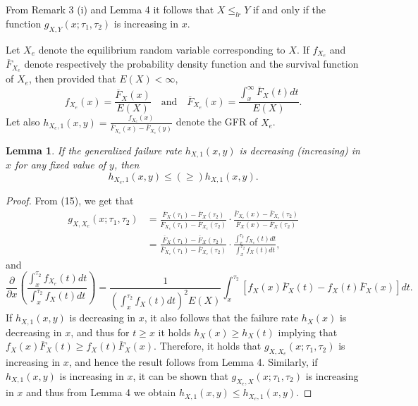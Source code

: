 \documentclass[11pt]{article}
\newtheorem{lemma}{Lemma}
\begin{document}
From Remark 3 (i) and Lemma 4 it follows that $X \leq_{lr} Y$ if and only if the function $g_{X,Y} (x;\tau_1,\tau_2)$ is increasing in $x$.

Let $X_e$ denote the equilibrium random variable corresponding to $X$. If $f_{X_e}$ and $\overline{F}_{X_e}$ denote respectively the probability density function and the survival function of $X_e$, then provided that $E(X)<\infty$,
$$ \textstyle f_{X_e} (x) = \frac{\overline{F}_X (x)}{E(X)} \quad \text{and} \quad \overline{F}_{X_e} (x) = \frac{\int_x^\infty \overline{F}_X (t) dt}{E(X)}. $$
Let also $ \textstyle h_{X_e,1} (x,y) = \frac{f_{X_e} (x)}{\overline{F}_{X_e} (x) - \overline{F}_{X_e} (y)} $
denote the GFR of $X_e$.

 
\begin{lemma}
	If the generalized failure rate $h_{X,1} (x,y)$ is decreasing (increasing) in $x$ for any fixed value of $y$, then
	$$ h_{X_e,1} (x,y) \leq (\geq) h_{X,1} (x,y). $$
\end{lemma}

\begin{proof} From (15), we get that
	\begin{align*} 
		g_{X,X_e} (x;\tau_1,\tau_2) & \textstyle = \frac{\overline{F}_X (\tau_1) - \overline{F}_X (\tau_2)}{\overline{F}_{X_e} (\tau_1) - \overline{F}_{X_e} (\tau_2)} \cdot \frac{\overline{F}_{X_e} (x) - \overline{F}_{X_e} (\tau_2)}{\overline{F}_X (x) - \overline{F}_X (\tau_2)} \\
		& \textstyle = \frac{\overline{F}_X (\tau_1) - \overline{F}_X (\tau_2)}{\overline{F}_{X_e} (\tau_1) - \overline{F}_{X_e} (\tau_2)} \cdot \frac{\int_x^{\tau_2} f_{X_e} (t) dt}{\int_x^{\tau_2} f_X (t) dt},
	\end{align*}
	and
	$$ \textstyle \frac{\partial}{\partial x} \left( \frac{\int_x^{\tau_2} f_{X_e} (t) dt}{\int_x^{\tau_2} f_X (t) dt} \right) = \frac{1}{\left(\int_x^{\tau_2} f_X (t) dt\right)^2 E(X)} \int_x^{\tau_2} \left[ f_X (x) \overline{F}_X (t) - f_X (t) \overline{F}_X (x) \right] dt. $$
	If $h_{X,1} (x,y)$ is decreasing in $x$, it also follows that the failure rate $h_X (x)$ is decreasing in $x$, and thus for $t \geq x$ it holds $h_X (x) \geq h_X (t)$ implying that
	$ f_X (x) \overline{F}_X (t) \geq f_X (t) \overline{F}_X (x) $. Therefore, it holds that $g_{X,X_e} (x;\tau_1,\tau_2)$ is increasing in $x$, and hence the result follows from Lemma 4. Similarly, if $h_{X,1} (x,y)$ is increasing in $x$, it can be shown that $g_{X_e,X} (x;\tau_1,\tau_2)$ is increasing in $x$ and thus from Lemma 4 we obtain $ h_{X,1} (x,y) \leq h_{X_e,1} (x,y). $
\end{proof}
\end{document}
